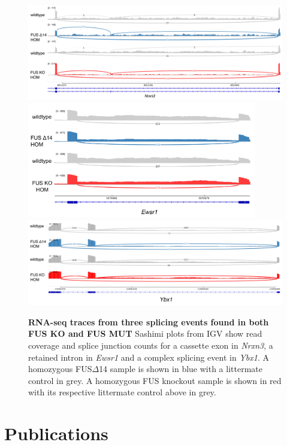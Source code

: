 \begin{figure}
	\centering
	\includegraphics[width=\textwidth]{Figures/06_fus_meta/Nrxn3.png}
	\includegraphics[width=10cm]{Figures/06_fus_meta/Ewsr1.png}
	\includegraphics[width=\textwidth]{Figures/06_fus_meta/Ybx1.png}
	\caption[RNA-seq traces from three splicing events found in both FUS KO and FUS MUT]{
		\textbf{RNA-seq traces from three splicing events found in both FUS KO and FUS MUT} 
	Sashimi plots from IGV show read coverage and splice junction counts for a cassette exon in \textit{Nrxn3}, a retained intron in \textit{Ewsr1} and a complex splicing event in \textit{Ybx1}.
	A homozygous FUS$\Delta$14 sample is shown in blue with a littermate control in grey. A homozygous FUS knockout sample is shown in red with its respective littermate control above in grey.
}
	\label{fig:fus_traces}
\end{figure}




\clearpage

\section{Publications}

